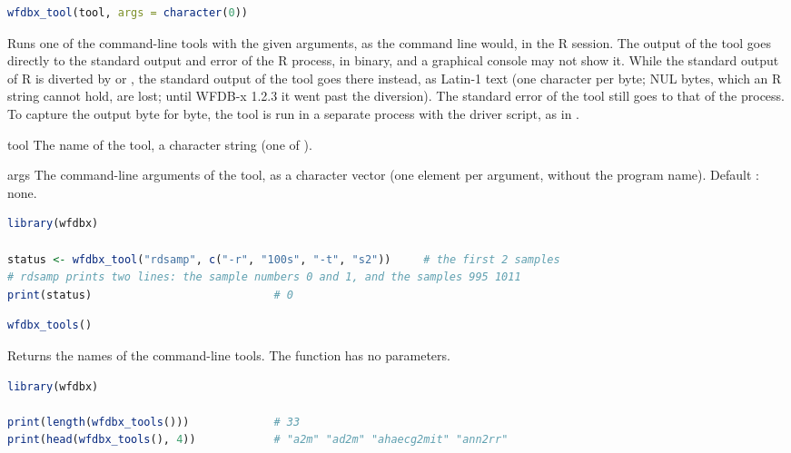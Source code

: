 \begin{lstlisting}[language=R,style=signature]
wfdbx_tool(tool, args = character(0))
\end{lstlisting}
Runs one of the command-line tools with the given arguments, as the command line would,
in the R session. The output of the tool goes directly to the standard output and error
of the R process, in binary, and a graphical console may not show it. While the standard
output of R is diverted by  or , the standard output of
the tool goes there instead, as Latin-1 text (one character per byte; NUL bytes, which an
R string cannot hold, are lost; until WFDB-x 1.2.3 it went past the diversion). The
standard error of the tool still goes to that of the process. To capture the output byte
for byte, the tool is run in a separate process with the driver script, as in
.
\begin{params}
\item[tool] The name of the tool, a character string (one of ).
\item[args] The command-line arguments of the tool, as a character vector (one element
  per argument, without the program name). Default : none.
\end{params}
\begin{lstlisting}[language=R,style=example]
library(wfdbx)

status <- wfdbx_tool("rdsamp", c("-r", "100s", "-t", "s2"))     # the first 2 samples
# rdsamp prints two lines: the sample numbers 0 and 1, and the samples 995 1011
print(status)                            # 0
\end{lstlisting}

\begin{lstlisting}[language=R,style=signature]
wfdbx_tools()
\end{lstlisting}
Returns the names of the command-line tools.
The function has no parameters.
\begin{lstlisting}[language=R,style=example]
library(wfdbx)

print(length(wfdbx_tools()))             # 33
print(head(wfdbx_tools(), 4))            # "a2m" "ad2m" "ahaecg2mit" "ann2rr"
\end{lstlisting}

